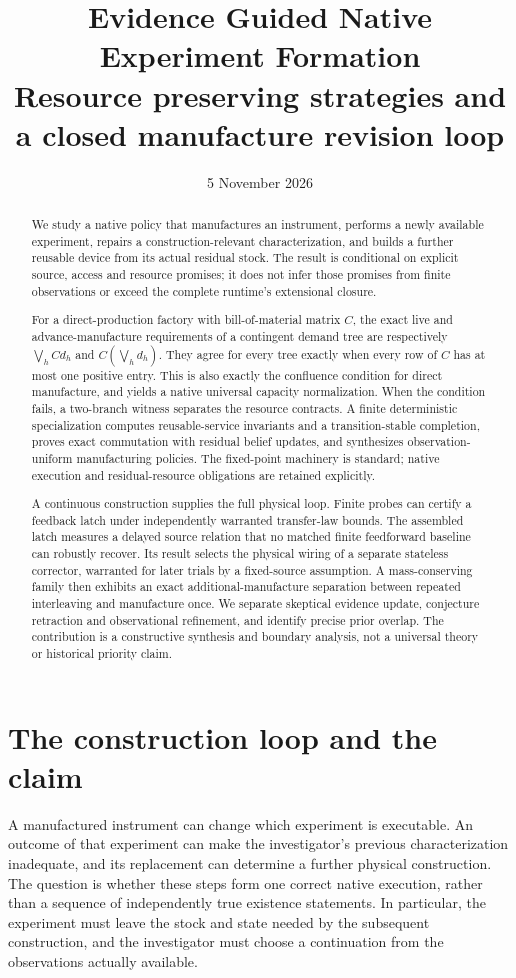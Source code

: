 \documentclass[11pt]{article}
\title{Evidence Guided Native Experiment Formation\\
\large Resource preserving strategies and a closed manufacture revision loop}
\author{}
\date{5 November 2026}
\theoremstyle{definition}
\theoremstyle{remark}
\begin{document}
\maketitle
\begin{abstract}
We study a native policy that manufactures an instrument, performs a newly
available experiment, repairs a construction-relevant characterization,
and builds a further reusable device from its actual residual stock.
The result is conditional on explicit source, access and resource promises;
it does not infer those promises from finite observations or exceed the
complete runtime's extensional closure.

For a direct-production factory with bill-of-material matrix $C$, the
exact live and advance-manufacture requirements of a contingent demand
tree are respectively $\bigvee_h Cd_h$ and $C(\bigvee_h d_h)$. They agree
for every tree exactly when every row of $C$ has at most one positive
entry. This is also exactly the confluence condition for direct
manufacture, and yields a native universal capacity normalization.
When the condition fails, a two-branch witness separates the resource
contracts. A finite deterministic specialization computes reusable-service
invariants and a transition-stable completion, proves exact commutation
with residual belief updates, and synthesizes observation-uniform
manufacturing policies. The fixed-point machinery is standard; native
execution and residual-resource obligations are retained explicitly.

A continuous construction supplies the full physical loop. Finite probes
can certify a feedback latch under independently warranted transfer-law
bounds. The assembled latch measures a delayed source relation that no
matched finite feedforward baseline can robustly recover. Its result
selects the physical wiring of a separate stateless corrector, warranted
for later trials by a fixed-source assumption. A mass-conserving family
then exhibits an exact additional-manufacture separation between repeated
interleaving and manufacture once. We separate skeptical evidence update,
conjecture retraction and observational refinement, and identify precise
prior overlap. The contribution is a constructive synthesis and boundary
analysis, not a universal theory or historical priority claim.
\end{abstract}
\tableofcontents


\section{The construction loop and the claim}\label{sec:loop-question}
A manufactured instrument can change which experiment is executable. An
outcome of that experiment can make the investigator's previous
characterization inadequate, and its replacement can determine a further
physical construction. The question is whether these steps form one
correct native execution, rather than a sequence of independently true
existence statements. In particular, the experiment must leave the stock
and state needed by the subsequent construction, and the investigator
must choose a continuation from the observations actually available.
\end{document}
